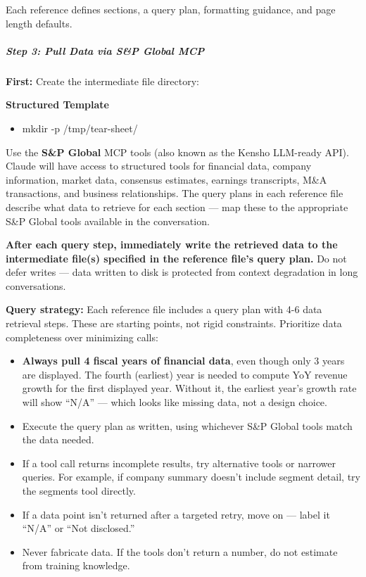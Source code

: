 \documentclass[11pt]{article}
\begin{document}
Each reference defines sections, a query plan, formatting guidance, and page length defaults.


\subparagraph{Step 3: Pull Data via S\&P Global MCP}\mbox{}\par

\textbf{First:} Create the intermediate file directory:

\textbf{Structured Template}
\begin{itemize}[leftmargin=*,itemsep=2pt,topsep=2pt]
\item {} mkdir -p /tmp/tear-sheet/
\end{itemize}

Use the \textbf{S\&P Global} MCP tools (also known as the Kensho LLM-ready API). Claude will have access to structured tools for financial data, company information, market data, consensus estimates, earnings transcripts, M\&A transactions, and business relationships. The query plans in each reference file describe what data to retrieve for each section — map these to the appropriate S\&P Global tools available in the conversation.


\textbf{After each query step, immediately write the retrieved data to the intermediate file(s) specified in the reference file's query plan.} Do not defer writes — data written to disk is protected from context degradation in long conversations.


\textbf{Query strategy:} Each reference file includes a query plan with 4-6 data retrieval steps. These are starting points, not rigid constraints. Prioritize data completeness over minimizing calls:


\begin{itemize}[leftmargin=*,itemsep=2pt,topsep=2pt]
\item {} \textbf{Always pull 4 fiscal years of financial data}, even though only 3 years are displayed. The fourth (earliest) year is needed to compute YoY revenue growth for the first displayed year. Without it, the earliest year's growth rate will show ``N/A'' — which looks like missing data, not a design choice.
\item {} Execute the query plan as written, using whichever S\&P Global tools match the data needed.
\item {} If a tool call returns incomplete results, try alternative tools or narrower queries. For example, if company summary doesn't include segment detail, try the segments tool directly.
\item {} If a data point isn't returned after a targeted retry, move on — label it ``N/A'' or ``Not disclosed.''
\item {} Never fabricate data. If the tools don't return a number, do not estimate from training knowledge.
\end{itemize}
\end{document}
